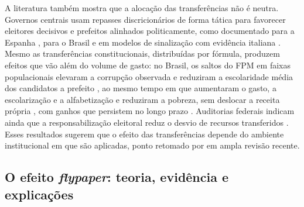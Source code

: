 A literatura também mostra que a alocação das transferências não é neutra. Governos centrais usam repasses discricionários de forma tática para favorecer eleitores decisivos \cite{johansson2003} e prefeitos alinhados politicamente, como documentado para a Espanha \cite{soleolle2008,simon2013}, para o Brasil \cite{brollo2012} e em modelos de sinalização com evidência italiana \cite{bracco2015}. Mesmo as transferências constitucionais, distribuídas por fórmula, produzem efeitos que vão além do volume de gasto: no Brasil, os saltos do FPM em faixas populacionais elevaram a corrupção observada e reduziram a escolaridade média dos candidatos a prefeito \cite{brollo2013}, ao mesmo tempo em que aumentaram o gasto, a escolarização e a alfabetização e reduziram a pobreza, sem deslocar a receita própria \cite{litschig2013}, com ganhos que persistem no longo prazo \cite{carvalhofilho2022}. Auditorias federais indicam ainda que a responsabilização eleitoral reduz o desvio de recursos transferidos \cite{ferraz2011}. Esses resultados sugerem que o efeito das transferências depende do ambiente institucional em que são aplicadas, ponto retomado por  em ampla revisão recente.

\subsection{O efeito \textit{flypaper}: teoria, evidência e explicações}

